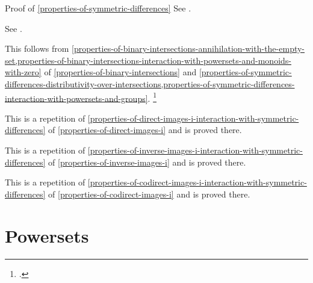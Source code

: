 \begin{Proof}{Proof of \cref{properties-of-symmetric-differences}}
    See \cite{MSE2719059}.

    See \cite{MSE2719059}.

    This follows from \cref{properties-of-binary-intersections-annihilation-with-the-empty-set,properties-of-binary-intersections-interaction-with-powersets-and-monoids-with-zero} of \cref{properties-of-binary-intersections} and \cref{properties-of-symmetric-differences-distributivity-over-intersections,properties-of-symmetric-differences-interaction-with-powersets-and-groups}.%
    \footnote{%
        \cite{proof-wiki:symmetric-difference-with-intersection-forms-ring}.
        \par\vspace*{\TCBBoxCorrection}
    }%

    This is a repetition of \cref{properties-of-direct-images-i-interaction-with-symmetric-differences} of \cref{properties-of-direct-images-i} and is proved there.

    This is a repetition of \cref{properties-of-inverse-images-i-interaction-with-symmetric-differences} of \cref{properties-of-inverse-images-i} and is proved there.

    This is a repetition of \cref{properties-of-codirect-images-i-interaction-with-symmetric-differences} of \cref{properties-of-codirect-images-i} and is proved there.
\end{Proof}
\section{Powersets}\label{section-powersets}
